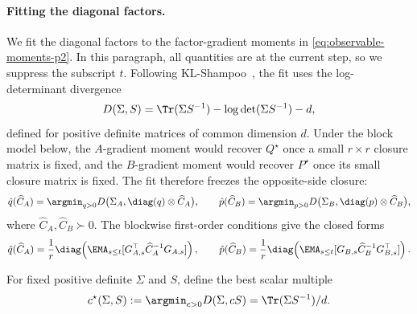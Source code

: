 \paragraph{Fitting the diagonal factors.}
We fit the diagonal factors to the factor-gradient moments in
\eqref{eq:observable-moments-p2}. In this paragraph, all quantities are
at the current step, so we suppress the subscript $t$. Following
KL-Shampoo~\cite{klshampoo}, the fit uses the log-determinant
divergence~\cite{logdetdiv}
\[
  D(\Sigma,S)=\Tr(\Sigma S^{-1})-\log\det(\Sigma S^{-1})-d,
\]
defined for positive definite matrices of common dimension $d$.
Under the block model below, the $A$-gradient moment would recover
$Q^\star$ once a small $r\times r$ closure matrix is fixed, and the
$B$-gradient moment would recover $P^\star$ once its small closure matrix is
fixed. The fit therefore freezes the opposite-side closure:
\begin{equation}\label{eq:factor-fit-p2}
  \hat{q}(\widehat C_A)
  =
  \argmin_{q>0}
  D\bigl(\Sigma_A,\diag(q)\otimes\widehat C_A\bigr),
  \qquad
  \hat{p}(\widehat C_B)
  =
  \argmin_{p>0}
  D\bigl(\Sigma_B,\diag(p)\otimes\widehat C_B\bigr),
\end{equation}
where $\widehat C_A,\widehat C_B\succ0$. The blockwise first-order
conditions give the closed forms
\[
  \hat{q}(\widehat C_A)
  =
  \frac1r\diag\!\left(
    \EMA_{s\le t}[G_{A,s}^\top\widehat C_A^{-1}G_{A,s}]
  \right),
  \qquad
  \hat{p}(\widehat C_B)
  =
  \frac1r\diag\!\left(
    \EMA_{s\le t}[G_{B,s}\widehat C_B^{-1}G_{B,s}^\top]
  \right).
\]

For fixed positive definite $\Sigma$ and $S$, define the best scalar
multiple
\[
  c^\star(\Sigma,S)
  :=
  \argmin_{c>0}D(\Sigma,cS)
  =
  \Tr(\Sigma S^{-1})/d .
\]

